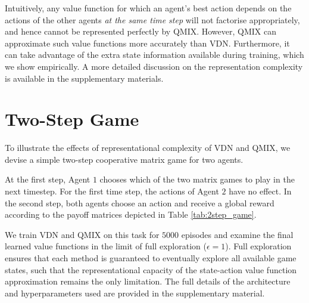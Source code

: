 \documentclass{article}
\begin{document}
Intuitively, any value function for which an agent's best action depends on the actions of the other agents \emph{at the same time step} will not factorise appropriately, and hence cannot be represented perfectly by QMIX. However, QMIX can approximate such value functions more accurately than VDN. Furthermore, it can take advantage of the extra state information available during training, which we show empirically. A more detailed discussion on the representation complexity is available in the supplementary materials.


 \section{Two-Step Game}
\label{sec:two_step_game}


To illustrate the effects of representational complexity of VDN and QMIX, we devise a simple two-step cooperative matrix game for two agents. 

At the first step, Agent $1$ chooses which of the two matrix games to play in the next timestep. For the first time step, the actions of Agent $2$ have no effect. In the second step, both agents choose an action and receive a global reward according to the payoff matrices depicted in Table \ref{tab:2step_game}.

We train VDN and QMIX on this task for $5000$ episodes and examine the final learned value functions in the limit of full exploration ($\epsilon=1$). Full exploration ensures that each method is guaranteed to eventually explore all available game states, such that the representational capacity of the state-action value function approximation remains the only limitation.
The full details of the architecture and hyperparameters used are provided in the supplementary material.
\end{document}
